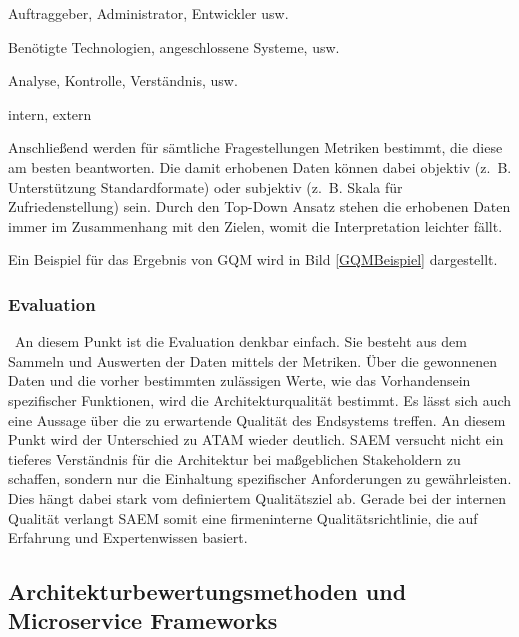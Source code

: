 \begin{description}[leftmargin=!,labelwidth=\widthof{\bfseries Anwendungsbereich}]
	\item[Sichtweise] Auftraggeber, Administrator, Entwickler usw.
	\item[Anwendungsbereich] Benötigte Technologien, angeschlossene Systeme, usw.
	\item[Zweck] Analyse, Kontrolle, Verständnis, usw.
	\item[Kontext] intern, extern
\end{description} 
 
Anschließend werden für sämtliche Fragestellungen Metriken bestimmt, die diese am besten beantworten. Die damit erhobenen Daten können dabei objektiv (z.~B. Unterstützung Standardformate) oder subjektiv (z.~B. Skala für Zufriedenstellung) sein.
Durch den Top-Down Ansatz stehen die erhobenen Daten immer im Zusammenhang mit den Zielen, womit die Interpretation leichter fällt. 

Ein Beispiel für das Ergebnis von \ac{GQM} wird in Bild \ref{GQMBeispiel} dargestellt.

 
\subsubsection{Evaluation}
\
An diesem Punkt ist die Evaluation denkbar einfach. Sie besteht aus dem Sammeln und Auswerten der Daten mittels der Metriken. Über die gewonnenen Daten und die vorher bestimmten zulässigen Werte, wie das Vorhandensein spezifischer Funktionen, wird die Architekturqualität bestimmt. Es lässt sich auch eine Aussage über die zu erwartende Qualität des Endsystems treffen.
An diesem Punkt wird der Unterschied zu \ac{ATAM} wieder deutlich. \ac{SAEM} versucht nicht ein tieferes Verständnis für die Architektur bei maßgeblichen Stakeholdern zu schaffen, sondern nur die Einhaltung spezifischer Anforderungen zu gewährleisten. Dies hängt dabei stark vom definiertem Qualitätsziel ab. Gerade bei der internen Qualität verlangt \ac{SAEM} somit eine firmeninterne Qualitätsrichtlinie\cite{IEEE_TSE2002}, die auf Erfahrung und Expertenwissen basiert.

\subsection{Architekturbewertungsmethoden und Microservice Frameworks}

